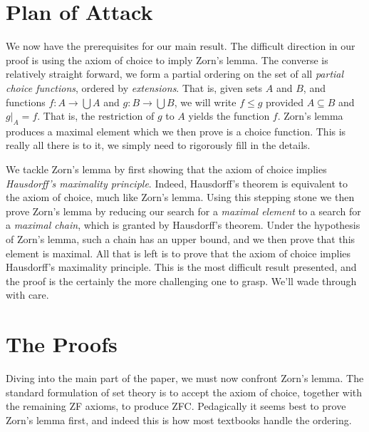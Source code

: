 \documentclass{article}
\theoremstyle{definition}
\begin{document}
    \section{Plan of Attack}
        We now have the prerequisites for our main result.
        The difficult direction in our proof is using the axiom of choice to
        imply Zorn's lemma. The converse is relatively straight forward, we
        form a partial ordering on the set of all
        \textit{partial choice functions}, ordered by \textit{extensions}.
        That is, given sets $A$ and $B$, and functions
        $f:A\rightarrow\bigcup{A}$ and $g:B\rightarrow\bigcup{B}$, we will
        write $f\leq{g}$ provided $A\subseteq{B}$ and
        $g|_{A}=f$. That is, the restriction of $g$ to $A$ yields the function
        $f$. Zorn's lemma produces a maximal element which we then prove is
        a choice function. This is really all there is to it, we simply need to
        rigorously fill in the details.
        \par\hfill\par
        We tackle Zorn's lemma by first showing that the axiom of choice
        implies \textit{Hausdorff's maximality principle}. Indeed, Hausdorff's
        theorem is equivalent to the axiom of choice, much like Zorn's lemma.
        Using this stepping stone we then prove Zorn's lemma by
        reducing our search for a \textit{maximal element} to a search for a
        \textit{maximal chain}, which is granted by Hausdorff's theorem.
        Under the hypothesis of Zorn's lemma, such a chain has an upper bound,
        and we then prove that this element is maximal. All that is left is to
        prove that the axiom of choice implies Hausdorff's maximality principle.
        This is the most difficult result presented, and the proof is the
        certainly the more challenging one to grasp. We'll wade through
        with care.
    \section{The Proofs}
        Diving into the main part of the paper, we must now confront
        Zorn's lemma. The standard formulation of set theory is to accept the
        axiom of choice, together with the remaining ZF axioms, to produce
        ZFC. Pedagically it seems best to prove Zorn's lemma first, and indeed
        this is how most textbooks handle the ordering.
\end{document}
